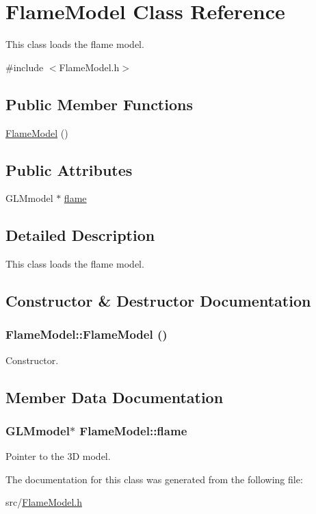 \hypertarget{classFlameModel}{
\section{FlameModel Class Reference}
\label{classFlameModel}
}


This class loads the flame model.  




{\ttfamily \#include $<$FlameModel.h$>$}

\subsection*{Public Member Functions}
\begin{DoxyCompactItemize}
\item 
\hyperlink{classFlameModel_abb2f303feef7173832d1eaaa872fc88d}{FlameModel} ()
\end{DoxyCompactItemize}
\subsection*{Public Attributes}
\begin{DoxyCompactItemize}
\item 
GLMmodel $\ast$ \hyperlink{classFlameModel_a061050ac3f29edf802e3fa737b28a079}{flame}
\end{DoxyCompactItemize}


\subsection{Detailed Description}
This class loads the flame model. 

\subsection{Constructor \& Destructor Documentation}
\hypertarget{classFlameModel_abb2f303feef7173832d1eaaa872fc88d}{
\subsubsection[{FlameModel}]{\setlength{\rightskip}{0pt plus 5cm}FlameModel::FlameModel ()}}
\label{classFlameModel_abb2f303feef7173832d1eaaa872fc88d}
Constructor. 

\subsection{Member Data Documentation}
\hypertarget{classFlameModel_a061050ac3f29edf802e3fa737b28a079}{
\subsubsection[{flame}]{\setlength{\rightskip}{0pt plus 5cm}GLMmodel$\ast$ {\bf FlameModel::flame}}}
\label{classFlameModel_a061050ac3f29edf802e3fa737b28a079}
Pointer to the 3D model. 

The documentation for this class was generated from the following file:\begin{DoxyCompactItemize}
\item 
src/\hyperlink{FlameModel_8h}{FlameModel.h}\end{DoxyCompactItemize}

